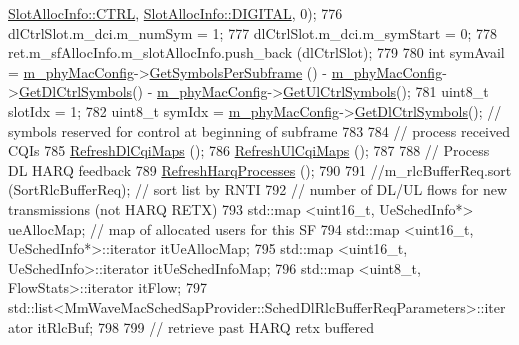 \begin{DoxyCode}
      \hyperlink{structns3_1_1SlotAllocInfo_a3ea7cb503bfd0c9a4df55a71b81b9331ad78b7d76ef82d56c33be1fa9c1867409}{SlotAllocInfo::CTRL}, \hyperlink{structns3_1_1SlotAllocInfo_adcbd067d82be6260b3399167d8f0b4eca47a67c342db658a08ded9ce4b49417ea}{SlotAllocInfo::DIGITAL}, 0);
776         dlCtrlSlot.m\_dci.m\_numSym = 1;
777         dlCtrlSlot.m\_dci.m\_symStart = 0;
778         ret.m\_sfAllocInfo.m\_slotAllocInfo.push\_back (dlCtrlSlot);
779 
780         \textcolor{keywordtype}{int} symAvail = \hyperlink{classns3_1_1MmWaveMacScheduler_a24d7af4971d2e500fe543cefbafa2fd9}{m\_phyMacConfig}->\hyperlink{classns3_1_1MmWavePhyMacCommon_a2fe835b76e3c689defa413e395cd10cb}{GetSymbolsPerSubframe} () - 
      \hyperlink{classns3_1_1MmWaveMacScheduler_a24d7af4971d2e500fe543cefbafa2fd9}{m\_phyMacConfig}->\hyperlink{classns3_1_1MmWavePhyMacCommon_a1be2da684374de93d7f501aab2441b5a}{GetDlCtrlSymbols}() - 
      \hyperlink{classns3_1_1MmWaveMacScheduler_a24d7af4971d2e500fe543cefbafa2fd9}{m\_phyMacConfig}->\hyperlink{classns3_1_1MmWavePhyMacCommon_aa0bf8af14050bc5dc6513fbc86319a9b}{GetUlCtrlSymbols}();
781         uint8\_t slotIdx = 1;
782         uint8\_t symIdx = \hyperlink{classns3_1_1MmWaveMacScheduler_a24d7af4971d2e500fe543cefbafa2fd9}{m\_phyMacConfig}->\hyperlink{classns3_1_1MmWavePhyMacCommon_a1be2da684374de93d7f501aab2441b5a}{GetDlCtrlSymbols}(); \textcolor{comment}{// symbols
       reserved for control at beginning of subframe}
783 
784         \textcolor{comment}{// process received CQIs}
785         \hyperlink{classns3_1_1MmWaveFlexTtiPfMacScheduler_a23d81177037898e2d2ba1840178ac647}{RefreshDlCqiMaps} ();
786         \hyperlink{classns3_1_1MmWaveFlexTtiPfMacScheduler_a3771e7640a49c7a6b4f8a84528e0fe85}{RefreshUlCqiMaps} ();
787 
788         \textcolor{comment}{// Process DL HARQ feedback}
789         \hyperlink{classns3_1_1MmWaveFlexTtiPfMacScheduler_a30881fe7ba728467c507b8a59e670d8d}{RefreshHarqProcesses} ();
790 
791         \textcolor{comment}{//m\_rlcBufferReq.sort (SortRlcBufferReq);       // sort list by RNTI}
792         \textcolor{comment}{// number of DL/UL flows for new transmissions (not HARQ RETX)}
793         std::map <uint16\_t, UeSchedInfo*> ueAllocMap;           \textcolor{comment}{// map of allocated users for this SF}
794         std::map <uint16\_t, UeSchedInfo*>::iterator itUeAllocMap;
795         std::map <uint16\_t, UeSchedInfo>::iterator itUeSchedInfoMap;
796         std::map <uint8\_t, FlowStats>::iterator itFlow;
797         std::list<MmWaveMacSchedSapProvider::SchedDlRlcBufferReqParameters>::iterator itRlcBuf;
798 
799         \textcolor{comment}{// retrieve past HARQ retx buffered}

\end{DoxyCode}
